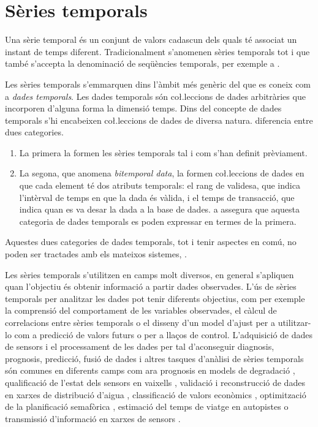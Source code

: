 \section{Sèries temporals}

Una sèrie temporal és un conjunt de valors cadascun dels quals té
associat un instant de temps diferent.  Tradicionalment s'anomenen
sèries temporals tot i que també s'accepta la denominació de
seqüències temporals, per exemple a \cite{last:hetland}.

Les sèries temporals s'emmarquen dins l'àmbit més genèric del que es
coneix com a \emph{dades temporals}. Les dades temporals són
co\l.leccions de dades arbitràries que incorporen d'alguna forma la
dimensió temps.  Dins del concepte de dades temporals s'hi encabeixen
co\l.leccions de dades de diversa natura. \textcite{assfalg08:thesis}
diferencia entre dues categories.
\begin{enumerate}
\item La primera la formen les sèries temporals tal i com s'han
  definit prèviament. 
\item La segona, que anomena \emph{bitemporal data}, la formen
  co\l.leccions de dades en que cada element té dos atributs
  temporals: el rang de validesa, que indica l'intèrval de temps en
  que la dada és vàlida, i el temps de transacció, que indica quan es
  va desar la dada a la base de dades.  \citeauthor{assfalg08:thesis}
  a \cite{assfalg08:thesis} assegura que aquesta categoria de dades
  temporals es poden expressar en termes de la primera.
\end{enumerate}
Aquestes dues categories de dades temporals, tot i tenir aspectes en
comú, no poden ser tractades amb els mateixos
sistemes, \parencite{schmidt95}.


Les sèries temporals s'utilitzen en camps molt diversos, en general
s'apliquen quan l'objectiu és obtenir informació a partir dades
observades. L'ús de sèries temporals per analitzar les dades pot tenir
diferents objectius, com per exemple la comprensió del comportament de
les variables observades, el càlcul de correlacions entre sèries
temporals o el disseny d'un model d'ajust per a utilitzar-lo com a
predicció de valors futurs o per a llaços de control.
L'adquisició de dades de sensors i el processament de les dades per tal d'aconseguir diagnosis, prognosis, predicció, fusió de dades i altres tasques d'anàlisi de sèries temporals són comunes en diferents camps com ara prognosis en models de degradació \parencite{yu11}, qualificació de l'estat dels sensors en vaixells \parencite{palmer07}, validació i reconstrucció de dades en xarxes de distribució d'aigua \parencite{quevedo10}, classificació de valors econòmics \parencite{dreyer95}, optimització de la planificació semafòrica \parencite{last11}, estimació del temps de viatge en autopistes \parencite{soriguera10} o transmissió d'informació en xarxes de sensors \parencite{jainagrawal05,yaogehrke02}.



